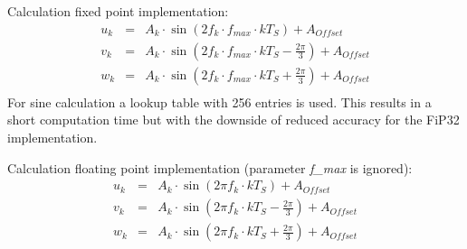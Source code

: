 Calculation fixed point implementation:
\begin{eqnarray*}
	u_k &=& A_k\cdot \sin{(2 f_k \cdot f_{max} \cdot k T_S)} + A_{Offset}\\
	v_k &=& A_k\cdot \sin{(2 f_k \cdot f_{max} \cdot k T_S - \frac{2\pi}{3})} + A_{Offset}\\
	w_k &=& A_k\cdot \sin{(2 f_k \cdot f_{max} \cdot k T_S + \frac{2\pi}{3})} + A_{Offset}\\
\end{eqnarray*}
For sine calculation a lookup table with 256 entries is used. This results in a short computation time but with the downside of reduced accuracy for the FiP32 implementation.

\medskip
Calculation floating point implementation (parameter \textit{f\_max} is ignored):
\begin{eqnarray*}
	u_k &=& A_k\cdot \sin{(2 \pi f_k \cdot k T_S)} + A_{Offset}\\
	v_k &=& A_k\cdot \sin{(2 \pi f_k \cdot k T_S - \frac{2\pi}{3})} + A_{Offset}\\
	w_k &=& A_k\cdot \sin{(2 \pi f_k \cdot k T_S + \frac{2\pi}{3})} + A_{Offset}\\
\end{eqnarray*}